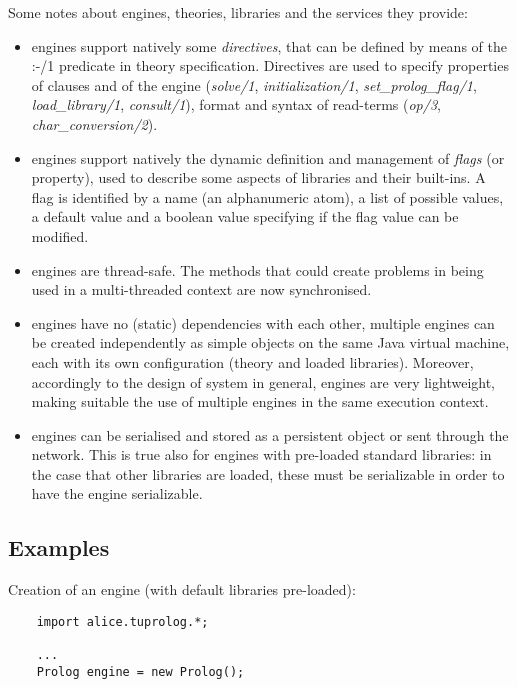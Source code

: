 \noindent Some notes about \tuprolog{} engines, theories,
libraries and the services they provide:

\begin{itemize}
%
\item \tuprolog{} engines support natively some
\emph{directives}, that can be defined by means of the :-/1
predicate in theory specification.
%
Directives are used to specify properties of clauses and of the
engine (\emph{solve/1}, \emph{initialization/1},
\emph{set\_prolog\_flag/1}, \emph{load\_library/1},
\emph{consult/1}), format and syntax of read-terms (\emph{op/3},
\emph{char\_conversion/2}).
%
\item \tuprolog{} engines support natively the dynamic definition
and management of \emph{flags} (or property), used to describe
some aspects of libraries and their built-ins.
%
A flag is identified by a name (an alphanumeric atom), a list of
possible values, a default value and a boolean value specifying if
the flag value can be modified.
%
\item \tuprolog{} engines are thread-safe. The methods that could
create problems in being used in a multi-threaded context are now
synchronised.
%
\item \tuprolog{} engines have no (static) dependencies with each
other, multiple engines can be created independently as simple
objects on the same Java virtual machine,  each with its own
configuration (theory and loaded libraries).
%
Moreover, accordingly to the design of \tuprolog{} system in
general, engines are very lightweight, making suitable the use of
multiple engines in the same execution context.
%
\item \tuprolog{} engines can be serialised and stored as a persistent
object or sent through the network.
%
This is true also for engines with pre-loaded standard libraries:
%
in the case that other libraries are loaded, these must be
serializable in order to have the engine serializable.
%
\end{itemize}


\subsection{Examples}

\noindent Creation of an engine (with default libraries pre-loaded):

{\tt\scriptsize{
\begin{verbatim}
    import alice.tuprolog.*;

    ...
    Prolog engine = new Prolog();
\end{verbatim} }}


